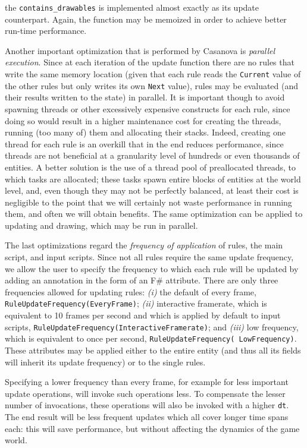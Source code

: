  the \texttt{contains\_drawables} is implemented almost exactly as its update counterpart. Again, the function may be memoized in order to achieve better run-time performance.

Another important optimization that is performed by Casanova is \textit{parallel execution}. Since at each iteration of the update function there are no rules that write the same memory location (given that each rule reads the \texttt{Current} value of the other rules but only writes its own \texttt{Next} value), rules may be evaluated (and their results written to the state) in parallel. It is important though to avoid spawning threads or other excessively expensive constructs for each rule, since doing so would result in a higher maintenance cost for creating the threads, running (too many of) them and allocating their stacks. Indeed, creating one thread for each rule is an overkill that in the end reduces performance, since threads are not beneficial at a granularity level of hundreds or even thousands of entities. A better solution is the use of a thread pool of preallocated threads, to which tasks are allocated; these tasks spawn entire blocks of entities at the world level, and, even though they may not be perfectly balanced, at least their cost is negligible to the point that we will certainly not waste performance in running them, and often we will obtain benefits. The same optimization can be applied to updating and drawing, which may be run in parallel.

The last optimizations regard the \textit{frequency of application} of rules, the main script, and input scripts. Since not all rules require the same update frequency, we allow the user to specify the frequency to which each rule will be updated by adding an annotation in the form of an F\# attribute. There are only three frequencies allowed for updating rules: \textit{(i)} the default of every frame, \texttt{RuleUpdateFrequency(EveryFrame)}; \textit{(ii)} interactive framerate, which is equivalent to 10 frames per second and which is applied by default to input scripts,  \texttt{RuleUpdateFrequency(InteractiveFramerate)}; and \textit{(iii)} low frequency, which is equivalent to once per second, \texttt{RuleUpdateFrequency( LowFrequency)}. These attributes may be applied either to the entire entity (and thus all its fields will inherit its update frequency) or to the single rules. 

Specifying a lower frequency than every frame, for example for less important update operations, will invoke such operations less. To compensate the lesser number of invocations, these operations will also be invoked with a higher \texttt{dt}. The end result will be less frequent updates which all cover longer time spans each: this will save performance, but without affecting the dynamics of the game world.

